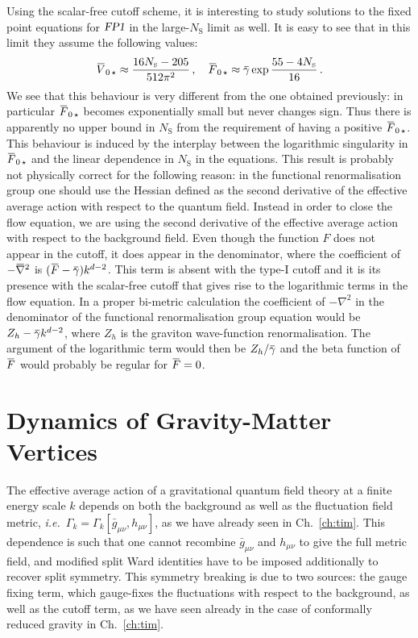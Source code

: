 \documentclass[11pt]{book}
\newcommand{\overbar}[1]{\mkern 1.5mu\overline{\mkern-1.5mu#1\mkern-1.5mu}\mkern 1.5mu}
\newcommand\NS{ N_{\scriptscriptstyle{\mathrm{S}}} }
\newcommand{\bnabla}{\overbar \nabla}
\newcommand{\FPone}  {\textsl{FP1}}
\newcommand{\bV}{\overbar V}
\newcommand{\bF}{\overbar F}
\newcommand{\bg}{\overbar \gamma}
\newcommand\ie{\textit{i.e.}\ }
\numberwithin{equation}{chapter}
\begin{document}
Using the scalar-free cutoff scheme, it is interesting to study solutions to
the fixed point equations for $\FPone$ in the large-$\NS$ limit as well.
It is easy to see that in this limit they assume the following values:
\begin{align}
  \bV_{0 \, \star} \approx \frac{ 16 \NS - 205 }{ 512 \pi^2 } \,, \quad
  \bF_{0 \, \star} \approx \bg\exp{\frac{ 55 - 4 \NS }{16}} \,.
\end{align}
We see that this behaviour is very different from the one obtained previously:
in particular $\bF_{0 \, \star}$ becomes exponentially small but never changes sign.
Thus there is apparently no upper bound in $\NS$ from the requirement of having a positive $\bF_{0 \, \star}$.
This behaviour is induced by the interplay between the logarithmic singularity
in $\bF_{0 \, \star}$ and the linear dependence in $\NS$ in the equations.
This result is probably not physically correct for the following
reason: in the functional renormalisation group one should use the Hessian defined as the second
derivative of the effective average action with respect to the quantum field.
Instead in order to close the flow equation,
we are using the second derivative of the
effective average action with respect to the background field.
Even though the function $F$ does not appear in the cutoff,
it does appear in the denominator, where the coefficient
of $-\bnabla^2$ is $(\bF-\bg) k^{d-2}$.
This term is absent with the type-I cutoff and
it is its presence with the scalar-free cutoff that gives rise
to the logarithmic terms in the flow equation.
In a proper bi-metric calculation the coefficient of
$-\nabla^2$ in the denominator of the functional renormalisation group equation
would be $Z_h-\bg k^{d-2}$, where $Z_h$ is the graviton
wave-function renormalisation.
The argument of the logarithmic term would then be $Z_h/\bg$
and the beta function of $\bF$ would probably be regular for $\bF=0$.




\chapter{Dynamics of Gravity-Matter Vertices}
\label{ch:astrid}

The effective average action of a gravitational quantum field theory
at a finite energy scale $k$
depends on both the background as well as the fluctuation field metric,
\ie $\Gamma_k = \Gamma_k[\bar{g}_{\mu \nu}, h_{\mu \nu}]$,
as we have already seen in Ch.~\ref{ch:tim}.
This dependence is such that one cannot recombine $\bar{g}_{\mu \nu}$
and $h_{\mu \nu}$ to give the full metric field,
and modified split Ward identities have to be imposed additionally
to recover split symmetry.
This symmetry breaking is due to two sources:
the gauge fixing term, which gauge-fixes the fluctuations with respect to the background,
as well as the cutoff term, as we have seen already in the case of conformally
reduced gravity in Ch.~\ref{ch:tim}.
\end{document}

